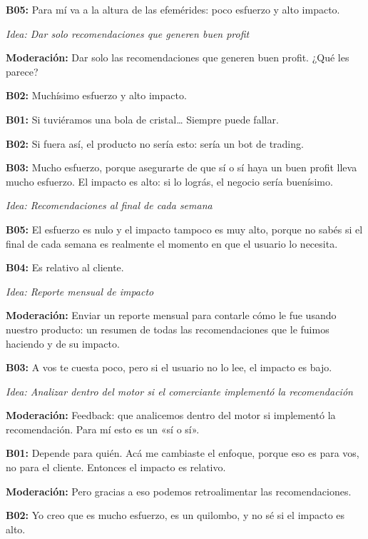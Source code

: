 \noindent\textbf{B05:} Para mí va a la altura de las efemérides: poco esfuerzo y alto impacto.

\medskip\noindent\textit{Idea: Dar solo recomendaciones que generen buen profit}

\noindent\textbf{Moderación:} Dar solo las recomendaciones que generen buen profit. ¿Qué les parece?

\noindent\textbf{B02:} Muchísimo esfuerzo y alto impacto.

\noindent\textbf{B01:} Si tuviéramos una bola de cristal… Siempre puede fallar.

\noindent\textbf{B02:} Si fuera así, el producto no sería esto: sería un bot de trading.

\noindent\textbf{B03:} Mucho esfuerzo, porque asegurarte de que sí o sí haya un buen profit lleva mucho esfuerzo. El impacto es alto: si lo lográs, el negocio sería buenísimo.

\medskip\noindent\textit{Idea: Recomendaciones al final de cada semana}

\noindent\textbf{B05:} El esfuerzo es nulo y el impacto tampoco es muy alto, porque no sabés si el final de cada semana es realmente el momento en que el usuario lo necesita.

\noindent\textbf{B04:} Es relativo al cliente.

\medskip\noindent\textit{Idea: Reporte mensual de impacto}

\noindent\textbf{Moderación:} Enviar un reporte mensual para contarle cómo le fue usando nuestro producto: un resumen de todas las recomendaciones que le fuimos haciendo y de su impacto.

\noindent\textbf{B03:} A vos te cuesta poco, pero si el usuario no lo lee, el impacto es bajo.

\medskip\noindent\textit{Idea: Analizar dentro del motor si el comerciante implementó la recomendación}

\noindent\textbf{Moderación:} Feedback: que analicemos dentro del motor si implementó la recomendación. Para mí esto es un «sí o sí».

\noindent\textbf{B01:} Depende para quién. Acá me cambiaste el enfoque, porque eso es para vos, no para el cliente. Entonces el impacto es relativo.

\noindent\textbf{Moderación:} Pero gracias a eso podemos retroalimentar las recomendaciones.

\noindent\textbf{B02:} Yo creo que es mucho esfuerzo, es un quilombo, y no sé si el impacto es alto.

